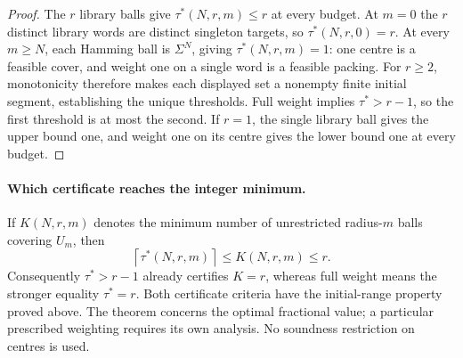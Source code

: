 \begin{proof}
The $r$ library balls give $\tau^*(N,r,m)\leq r$ at every budget.
At $m=0$ the $r$ distinct library words are distinct singleton targets,
so $\tau^*(N,r,0)=r$. At every $m\geq N$, each Hamming ball is
$\Sigma^N$, giving $\tau^*(N,r,m)=1$: one centre is a feasible cover,
and weight one on a single word is a feasible packing. For $r\geq2$,
monotonicity therefore makes each displayed set a nonempty finite initial
segment, establishing the unique thresholds. Full weight implies
$\tau^*>r-1$, so the first threshold is at most the second.
If $r=1$, the single library ball gives the upper bound one, and weight
one on its centre gives the lower bound one at every budget.
\end{proof}

\paragraph{Which certificate reaches the integer minimum.}
If $K(N,r,m)$ denotes the minimum number of unrestricted radius-$m$ balls
covering $U_m$, then
\[
 \left\lceil\tau^*(N,r,m)\right\rceil\leq K(N,r,m)\leq r.
\]
Consequently $\tau^*>r-1$ already certifies $K=r$, whereas full weight
means the stronger equality $\tau^*=r$. Both certificate criteria have
the initial-range property proved above. The theorem concerns the
optimal fractional value; a particular prescribed weighting requires
its own analysis. No soundness restriction on centres is used.
